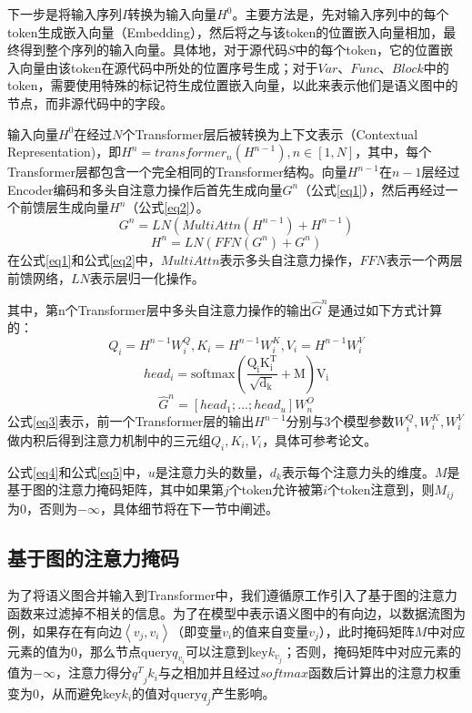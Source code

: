 下一步是将输入序列$I$转换为输入向量$H^0$。主要方法是，先对输入序列中的每个token生成嵌入向量（Embedding），然后将之与该token的位置嵌入向量相加，最终得到整个序列的输入向量。具体地，对于源代码$S$中的每个token，它的位置嵌入向量由该token在源代码中所处的位置序号生成；对于$Var$、$Func$、$Block$中的token，需要使用特殊的标记符生成位置嵌入向量，以此来表示他们是语义图中的节点，而非源代码中的字段。

输入向量$H^0$在经过$N$个Transformer层后被转换为上下文表示（Contextual Representation)，即$H^n=transformer_n(H^{n-1}),n\in[1,N]$，其中，每个Transformer层都包含一个完全相同的Transformer结构。向量$H^{n-1}$在$n-1$层经过Encoder编码和多头自注意力操作\cite{attention}后首先生成向量$G^n$（公式\eqref{eq1}），然后再经过一个前馈层生成向量$H^n$（公式\eqref{eq2}）。
\begin{equation}
    G^n=LN(MultiAttn(H^{n-1})+H^{n-1}) \label{eq1}
\end{equation}
\begin{equation}
H^n=LN(FFN(G^n)+G^n) \label{eq2}
\end{equation}
在公式\eqref{eq1}和公式\eqref{eq2}中，$MultiAttn$表示多头自注意力操作，$FFN$表示一个两层前馈网络，$LN$表示层归一化操作。

其中，第n个Transformer层中多头自注意力操作的输出$\hat{G}^n$是通过如下方式计算的：
\begin{equation}
Q_i=H^{n-1}W_i^Q, K_i=H^{n-1}W_i^K, V_i=H^{n-1}W_i^V \label{eq3}
\end{equation}
\begin{equation}
head_i=\text{softmax}(\frac{\mathrm{Q_iK_i^T}}{\sqrt{\mathrm{d_k}}}+\mathrm{M})\mathrm{V_i} \label{eq4}
\end{equation}
\begin{equation}
\hat{G}^n=[head_1;...;head_u]W_n^O \label{eq5}
\end{equation}
公式\eqref{eq3}表示，前一个Transformer层的输出$H^{n-1}$分别与3个模型参数$W_i^Q,W_i^K,W_i^V$做内积后得到注意力机制中的三元组$Q_i,K_i,V_i$，具体可参考论文\cite{attention}。

公式\eqref{eq4}和公式\eqref{eq5}中，$u$是注意力头的数量，$d_k$表示每个注意力头的维度。$M$是基于图的注意力掩码矩阵，其中如果第$j$个token允许被第$i$个token注意到，则$M_{ij}$为0，否则为$-\infty$，具体细节将在下一节中阐述。



\subsection{基于图的注意力掩码}
\label{sec:基于图的注意力掩码}
为了将语义图合并输入到Transformer中，我们遵循原工作\cite{guo2020graphcodebert}引入了基于图的注意力函数来过滤掉不相关的信息。为了在模型中表示语义图中的有向边，以数据流图为例，如果存在有向边$\left\langle v_j,v_i \right\rangle$（即变量$v_i$的值来自变量$v_j$），此时掩码矩阵$M$中对应元素的值为0，那么节点query$q_{v_i}$可以注意到key$k_{v_j}$；否则，掩码矩阵中对应元素的值为$-\infty$，注意力得分${q^T}_jk_i$与之相加并且经过$softmax$函数后计算出的注意力权重变为0，从而避免key$k_i$的值对query$q_j$产生影响。%

